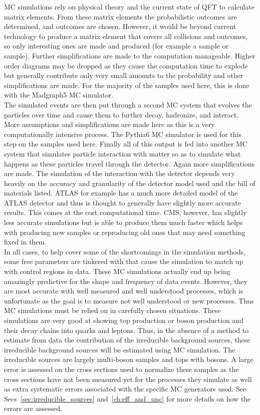 	MC simulations rely on physical theory and the current state of QFT to calculate matrix elements. From these matrix elements the probabilistic outcomes are determined, and outcomes are chosen. However, it would be beyond current technology to produce a matrix element that covers all collisions and outcomes, so only interesting ones are made and produced (for example a \ttZ sample or \WZZ sample). Further simplifications are made to the computation manageable. Higher order diagrams may be dropped as they cause the computation time to explode but generally contribute only very small amounts to the probability and other simplifications are made. For the majority of the samples used here, this is done with the Madgraph5 MC simulator.\\
	
	The simulated events are then put through a second MC system that evolves the particles over time and cause them to further decay, hadronize, and interact. More assumptions and simplifications are made here as this is a very computationally intensive process. The Pythia6 MC simulator is used for this step on the samples used here. Finally  all of this output is fed into another MC system that simulates particle interaction with matter so as to simulate what happens as these particles travel through the detector. Again more simplifications are made. The simulation of the interaction with the detector depends very heavily on the accuracy and granularity of the detector model used and the bill of materials listed. ATLAS for example has a much more detailed model of the ATLAS detector and thus is thought to generally have slightly more accurate results. This comes at the cost computational time. CMS, however, has slightly less accurate simulations but is able to produce them much faster which helps with producing new samples or reproducing old ones that may need something fixed in them.\\
	
	In all cases, to help cover some of the shortcomings in the simulation methods, some free parameters are tinkered with that cause the simulation to match up with control regions in data. These MC simulations actually end up being amazingly predictive for the shape and frequency of data events. However, they are most accurate with well measured and well understood processes, which is unfortunate as the goal is to measure not well understood or new processes. Thus MC simulations must be relied on in carefully chosen situations. These simulations are very good at showing top production or boson production and their decay chains into quarks and leptons. Thus, in the absence of a method to estimate from data the contribution of the irreducible background sources, these irreducible background sources will be estimated using MC simulation. The irreducible sources are largely multi-boson samples and tops with bosons. A large error is assessed on the cross sections used to normalize these samples as the cross sections have not been measured yet for the processes they simulate as well as extra systematic errors associated with the specific MC generators used. See Secs~\ref{sec:irreducible_sources} and~\ref{ch:eff_and_unc} for more details on how the errors are assessed.
	
